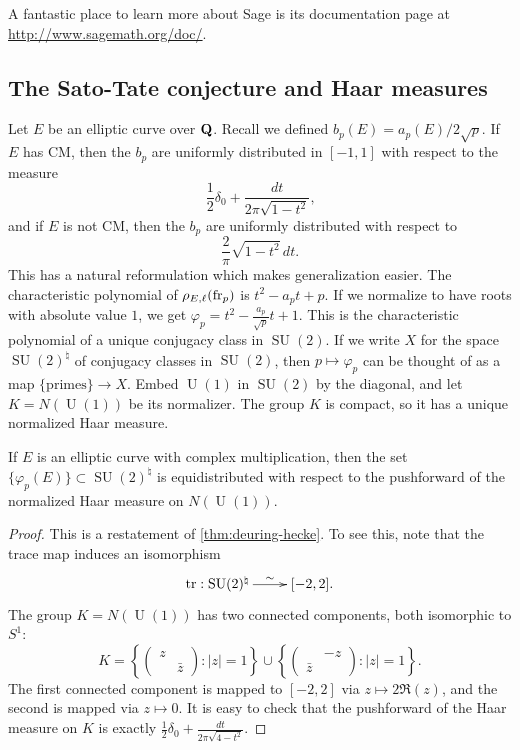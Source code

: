 A fantastic place to learn more about Sage is its documentation page at 
\url{http://www.sagemath.org/doc/}. 





\subsection{The Sato-Tate conjecture and Haar measures}

Let $E$ be an elliptic curve over $\mathbf{Q}$. Recall we defined 
$b_p(E) = a_p(E)/2\sqrt p$. If $E$ has CM, then the $b_p$ are 
uniformly distributed in $[-1,1]$ with respect to the measure 
\[
  \frac 1 2 \delta_0 + \frac{dt}{2\pi\sqrt{1-t^2}} \text{,}
\]
and if $E$ is not CM, then the $b_p$ are uniformly distributed with respect to 
\[
  \frac{2}{\pi} \sqrt{1-t^2}\, dt \text{.}
\]
This has a natural reformulation which makes generalization easier. The 
characteristic polynomial of $\rho_{E,\ell}(\mathrm{fr}_p)$ is 
$t^2-a_p t + p$. If we normalize to have roots with absolute value $1$, we get 
$\varphi_p = t^2 - \frac{a_p}{\sqrt p} t + 1$. This is the characteristic 
polynomial of a unique conjugacy class in $\operatorname{SU}(2)$. If we write 
$X$ for the space $\operatorname{SU}(2)^\natural$ of 
conjugacy classes in $\operatorname{SU}(2)$, then $p\mapsto \varphi_p$ can be 
thought of as a map $\{\text{primes}\} \to X$. Embed $\operatorname{U}(1)$ in 
$\operatorname{SU}(2)$ by the diagonal, and let $K=N(\operatorname{U}(1))$ be 
its normalizer. The group $K$ is compact, so it has a unique normalized Haar 
measure.

\begin{theorem}
If $E$ is an elliptic curve with complex multiplication, then the 
set $\{\varphi_p(E)\}\subset \operatorname{SU}(2)^\natural$ is 
equidistributed with respect to the pushforward of the normalized Haar measure 
on $N(\operatorname{U}(1))$. 
\end{theorem}
\begin{proof}
This is a restatement of \autoref{thm:deuring-hecke}. To see this, note 
that the trace map induces an isomorphism 
\[\xymatrix{
  \trace : \operatorname{SU}(2)^\natural \ar[r]^-\sim 
    & [-2,2] \text{.}
}\]
The group $K=N(\operatorname{U}(1))$ has two connected components, both 
isomorphic to $S^1$:
\[
  K = 
  \left\{\begin{pmatrix} 
    z & \\ 
    & \bar z 
  \end{pmatrix} : |z|=1 \right\} 
  \cup \left\{\begin{pmatrix}
         & -z\\ 
         \bar z & 
       \end{pmatrix} : |z|=1\right\} \text{.}
\]
The first connected component is mapped to $[-2,2]$ via 
$z\mapsto 2\Re (z)$, and the second is mapped via $z\mapsto 0$. It is easy to 
check that the pushforward of the Haar measure on $K$ is exactly 
$\frac 1 2 \delta_0 + \frac{dt}{2\pi \sqrt{4-t^2}}$. 
\end{proof}


